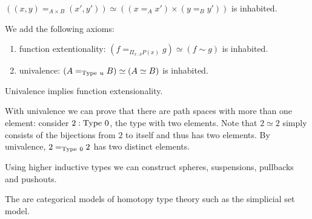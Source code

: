 \begin{boxlem}
    $((x,y) \mathrel{=_{A \times B} (x', y')}) \simeq ((x \mathrel{=_A} x') \times (y \mathrel{=_B} y'))$ is inhabited.
\end{boxlem}

\begin{boxdefi}
    We add the following axioms: 
    \begin{enumerate}
        \item \alert{function extentionality}: $(f \mathrel{=_{\Pi_{x : A}P(x)}} g) \simeq (f \sim g)$ is inhabited.
        \item \alert{univalence}: $(A \mathrel{=_{\mathrm{Type}\ u}} B) \simeq (A \simeq B)$ is inhabited.
    \end{enumerate}
\end{boxdefi}

\begin{boxthm}
    Univalence implies function extensionality.
\end{boxthm}

\begin{rem}
    With univalence we can prove that there are path spaces with more than one element: 
    consider $2 : \mathrm{Type}\ 0$, the type with two elements. 
    Note that $2 \simeq 2$ simply consists of the bijections from $2$ to itself and thus has two elements. 
    By univalence, $2 \mathrel{=_{\mathrm{Type}\ 0}} 2$ has two distinct elements.
\end{rem}


\begin{rem}
    Using higher inductive types we can construct spheres, suspensions, pullbacks and pushouts. 
\end{rem}

\begin{rem}
    The are categorical models of homotopy type theory such as the simplicial set model. 
\end{rem}

